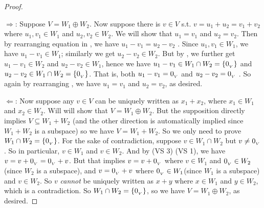 \begin{proof}\ 

\(\Longrightarrow\): Suppose \(V = W_1 \oplus W_2\).
Now suppose there is \(v \in V\) s.t. \(v = u_1 + u_2 = v_1 + v_2\)  where \(u_1, v_1 \in W_1\) and \(u_2, v_2 \in W_2\).
We will show that \(u_1 = v_1\) and \(u_2 = v_2\).
Then by rearranging equation in , we have \(u_1 - v_1 = u_2 - v_2\) .
Since \(u_1, v_1 \in W_1\), we have \(u_1 - v_1 \in W_1\); similarly we get \(u_2 - v_2 \in W_2\).
But by , we further get \(u_1 - v_1 \in W_2\) and \(u_2 - v_2 \in W_1\), hence we have \(u_1 - v_1 \in W_1 \cap W_2 = \{ 0_{_V} \}\) and \(u_2 - v_2 \in W_1 \cap W_2 = \{ 0_{_V} \}\).
That is, both \(u_1 - v_1 = 0_{_V}\) and \(u_2 - v_2 = 0_{_V}\) .
So again by rearranging , we have \(u_1 = v_1\) and \(u_2 = v_2\), as desired.

\(\Longleftarrow\): Now suppose any \(v \in V\) can be uniquely written as \(x_1 + x_2\), where \(x_1 \in W_1\) and \(x_2 \in W_2\).
Will will show that \(V = W_1 \oplus W_2\).
But the supposition directly implies \(V \subseteq W_1 + W_2\) (and the other direction is automatically implied since \(W_1 + W_2\) is a subspace) so we have \(V = W_1 + W_2\).
So we only need to prove \(W_1 \cap W_2 = \{ 0_{_V} \}\).
For the sake of contradiction, suppose \(v \in W_1 \cap W_2\) but \(v \ne 0_{_V}\).
So in particular, \(v \in W_1\) and \(v \in W_2\).
And by (VS 3) (VS 1), we have \(v = v + 0_{_V} = 0_{_V} + v\).
But that implies \(v = v + 0_{_V}\) where \(v \in W_1\) and \(0_{_V} \in W_2\)(since \(W_2\) is a subspace), and \(v = 0_{_V} + v\) where \(0_{_V} \in W_1\)(since \(W_1\) is a subspace) and \(v \in W_2\).
So \(v\) \emph{cannot} be uniquely written as \(x + y\) where \(x \in W_1\) and \(y \in W_2\), which is a contradiction.
So \(W_1 \cap W_2 = \{ 0_{_V} \}\), so we have \(V = W_1 \oplus W_2\), as desired.
\end{proof}

